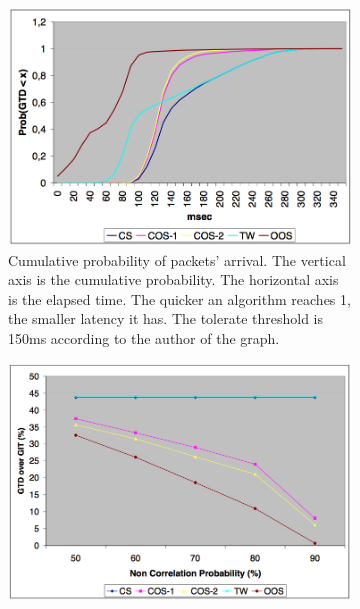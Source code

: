 \documentclass{article}
\begin{document}
\begin{figure}
\begin{center}
\begin{subfigure}[b]{\textwidth}
	\begin{center}
	\includegraphics[scale=0.3]{images/saclm.png}
	\caption{Cumulative probability of packets' arrival. The vertical axis is the cumulative probability. The horizontal axis is the elapsed time. The quicker an algorithm reaches 1, the smaller latency it has. The tolerate threshold is 150ms according to the author of the graph.}
	\label{fig:saclm}
	\end{center}
\end{subfigure}
\begin{subfigure}[b]{\textwidth}
	\begin{center}
	\includegraphics[scale=0.3]{images/sapct.png}

\end{center}
\end{subfigure}
\end{center}
\end{figure}
\end{document}
